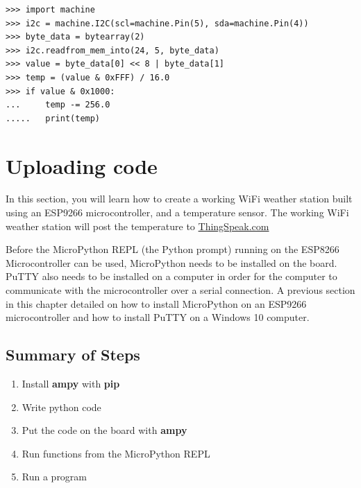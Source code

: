 \documentclass{book}
\providecommand{\tightlist}{%
      \setlength{\itemsep}{0pt}\setlength{\parskip}{0pt}}
\begin{document}
\begin{lstlisting}
>>> import machine
>>> i2c = machine.I2C(scl=machine.Pin(5), sda=machine.Pin(4))
>>> byte_data = bytearray(2)
>>> i2c.readfrom_mem_into(24, 5, byte_data)
>>> value = byte_data[0] << 8 | byte_data[1]
>>> temp = (value & 0xFFF) / 16.0
>>> if value & 0x1000:
...     temp -= 256.0
.....   print(temp)
\end{lstlisting}
    




    
        \section{Uploading code}\label{uploading-code}
    




    
        In this section, you will learn how to create a working WiFi weather
station built using an ESP9266 microcontroller, and a temperature
sensor. The working WiFi weather station will post the temperature to
\href{https://thingspeak.com/}{ThingSpeak.com}

Before the MicroPython REPL (the Python prompt) running on the ESP8266
Microcontroller can be used, MicroPython needs to be installed on the
board. PuTTY also needs to be installed on a computer in order for the
computer to communicate with the microcontroller over a serial
connection. A previous section in this chapter detailed on how to
install MicroPython on an ESP9266 microcontroller and how to install
PuTTY on a Windows 10 computer.
    




    
        \subsection{Summary of Steps}\label{summary-of-steps}
    




    
        \begin{enumerate}
\def\labelenumi{\arabic{enumi}.}
\tightlist
\item
  Install \textbf{ampy} with \textbf{pip}
\item
  Write python code
\item
  Put the code on the board with \textbf{ampy}
\item
  Run functions from the MicroPython REPL
\item
  Run a program
\end{enumerate}
    
\end{document}

